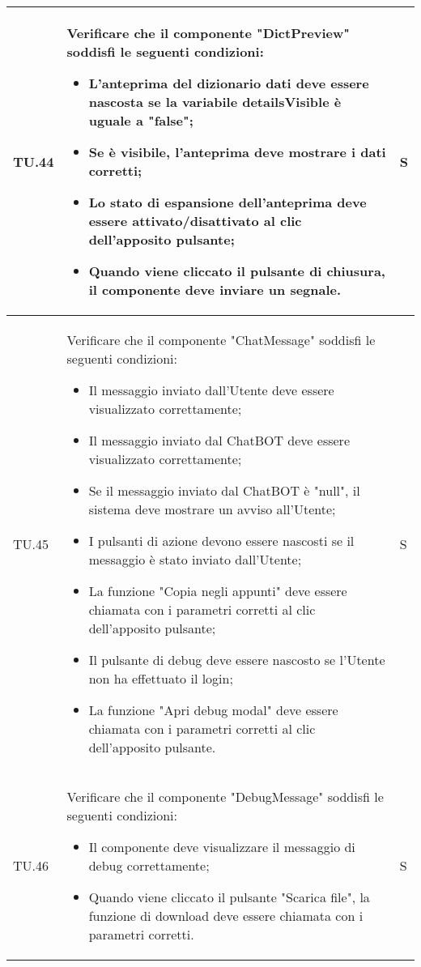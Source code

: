 \begin{adjustwidth}{-0.5cm}{-0.5cm}
\begin{longtable}{|P{1.5cm}|>{\raggedright}P{9.5cm}|>{\arraybackslash}P{1.5cm}|}
		\hline TU.44 & Verificare che il componente "DictPreview" soddisfi le seguenti condizioni:
    \begin{itemize}
      \item L'anteprima del dizionario dati deve essere nascosta se la variabile detailsVisible è uguale a "false";
			\item Se è visibile, l'anteprima deve mostrare i dati corretti;
			\item Lo stato di espansione dell'anteprima deve essere attivato/disattivato al clic dell'apposito pulsante;
			\item Quando viene cliccato il pulsante di chiusura, il componente deve inviare un segnale.
    \end{itemize} & S \\

		\hline TU.45 & Verificare che il componente "ChatMessage" soddisfi le seguenti condizioni:
    \begin{itemize}
      \item Il messaggio inviato dall'Utente deve essere visualizzato correttamente;
			\item Il messaggio inviato dal ChatBOT deve essere visualizzato correttamente;
			\item Se il messaggio inviato dal ChatBOT è "null", il sistema deve mostrare un avviso all'Utente;
			\item I pulsanti di azione devono essere nascosti se il messaggio è stato inviato dall'Utente;
			\item La funzione "Copia negli appunti" deve essere chiamata con i parametri corretti al clic dell'apposito pulsante;
			\item Il pulsante di debug deve essere nascosto se l'Utente non ha effettuato il login;
			\item La funzione "Apri debug modal" deve essere chiamata con i parametri corretti al clic dell'apposito pulsante.
    \end{itemize} & S \\

		\hline TU.46 & Verificare che il componente "DebugMessage" soddisfi le seguenti condizioni:
    \begin{itemize}
      \item Il componente deve visualizzare il messaggio di debug correttamente;
			\item Quando viene cliccato il pulsante "Scarica file", la funzione di download deve essere chiamata con i parametri corretti.
    \end{itemize} & S \\


\end{longtable}
\end{adjustwidth}
